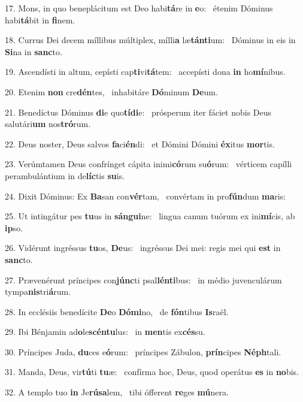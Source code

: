17. Mons, in quo beneplácitum est Deo habi\textbf{tá}re in \textbf{e}o: \ast\  étenim Dóminus habi\textbf{tá}bit in \textbf{fi}nem.\

18. Currus Dei decem míllibus múltiplex, mílli\textbf{a} læ\textbf{tán}\textbf{ti}um: \ast\  Dóminus in eis in \textbf{Si}na in \textbf{sanc}to.\

19. Ascendísti in altum, cepísti cap\textbf{ti}vi\textbf{tá}tem: \ast\  accepísti dona \textbf{in} ho\textbf{mí}nibus.\

20. Etenim \textbf{non} cre\textbf{dén}tes, \ast\  inhabitáre \textbf{Dó}minum \textbf{De}um.\

21. Benedíctus Dóminus \textbf{di}e quo\textbf{tí}\textbf{di}e: \ast\  prósperum iter fáciet nobis Deus salutári\textbf{um} nos\textbf{tró}rum.\

22. Deus noster, Deus salvos \textbf{fa}ci\textbf{én}di: \ast\  et Dómini Dómini \textbf{éx}itus \textbf{mor}tis.\

23. Verúmtamen Deus confrínget cápita inimi\textbf{có}rum su\textbf{ó}rum: \ast\  vérticem capílli perambulántium in de\textbf{líc}tis \textbf{su}is.\

24. Dixit Dóminus: Ex \textbf{Ba}san con\textbf{vér}tam, \ast\  convértam in pro\textbf{fún}dum \textbf{ma}ris:\

25. Ut intingátur pes \textbf{tu}us in \textbf{sán}\textbf{gui}ne: \ast\  lingua canum tuórum ex ini\textbf{mí}cis, ab \textbf{ip}so.\

26. Vidérunt ingréssus \textbf{tu}os, \textbf{De}us: \ast\  ingréssus Dei mei: regis mei qui \textbf{est} in \textbf{sanc}to.\

27. Prævenérunt príncipes con\textbf{júnc}ti psal\textbf{lén}\textbf{ti}bus: \ast\  in médio juvenculárum tympa\textbf{nis}tri\textbf{á}rum.\

28. In ecclésiis benedícite \textbf{De}o \textbf{Dó}\textbf{mi}no, \ast\  de \textbf{fón}tibus \textbf{Is}raël.\

29. Ibi Bénjamin ad\textbf{o}le\textbf{scén}\textbf{tu}lus: \ast\  in \textbf{men}tis ex\textbf{cés}su.\

30. Príncipes Juda, \textbf{du}ces e\textbf{ó}rum: \ast\  príncipes Zábulon, \textbf{prín}cipes \textbf{Néph}tali.\

31. Manda, Deus, vir\textbf{tú}ti \textbf{tu}æ: \ast\  confírma hoc, Deus, quod operátus \textbf{es} in \textbf{no}bis.\

32. A templo tuo \textbf{in} Je\textbf{rú}\textbf{sa}lem, \ast\  tibi ófferent \textbf{re}ges \textbf{mú}nera.\

